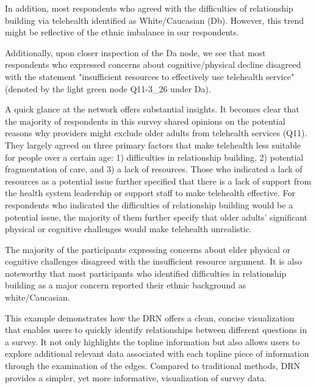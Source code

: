 In addition, most respondents who agreed with the difficulties of relationship building via telehealth identified as White/Caucasian (Db). However, this trend might be reflective of the ethnic imbalance in our respondents.

Additionally, upon closer inspection of the Da node, we see that most respondents who expressed concerns about cognitive/physical decline disagreed with the statement "insufficient resources to effectively use telehealth service" (denoted by the light green node Q11-3\_26 under Da).

A quick glance at the network offers substantial insights. It becomes clear that the majority of respondents in this survey shared opinions on the potential reasons why providers might exclude older adults from telehealth services (Q11). They largely agreed on three primary factors that make telehealth less suitable for people over a certain age: 1) difficulties in relationship building, 2) potential fragmentation of care, and 3) a lack of resources. Those who indicated a lack of resources as a potential issue further specified that there is a lack of support from the health system leadership or support staff to make telehealth effective. For respondents who indicated the difficulties of relationship building would be a potential issue, the majority of them further specify that older adults’ significant physical or cognitive challenges would make telehealth unrealistic.

The majority of the participants expressing concerns about elder physical or cognitive challenges disagreed with the insufficient resource argument. It is also noteworthy that most participants who identified difficulties in relationship building as a major concern reported their ethnic background as white/Caucasian.

This example demonstrates how the DRN offers a clean, concise visualization that enables users to quickly identify relationships between different questions in a survey. It not only highlights the topline information but also allows users to explore additional relevant data associated with each topline piece of information through the examination of the edges. Compared to traditional methods, DRN provides a simpler, yet more informative, visualization of survey data.



